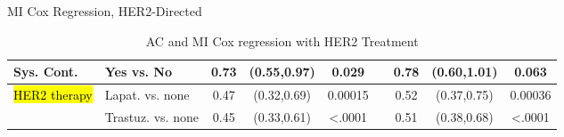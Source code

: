 \begin{frame}{MI Cox Regression, HER2-Directed}
\begin{table}[]
{\begin{tabular}{|l|l|c|c|c|c|c|c|c|}
Sys. Cont.                     & Yes vs. No                       & 0.73                  & (0.55,0.97)                                        & 0.029                 &                       & 0.78 & (0.60,1.01)                                                          & 0.063                                                       \\ \hline
\hl{HER2 therapy}                   & Lapat. vs. none                   & 0.47                  & (0.32,0.69)                                        & 0.00015               &                       & 0.52 & (0.37,0.75)                                                          & 0.00036                                                     \\ \hline
                               & Trastuz. vs. none                 & 0.45                  & (0.33,0.61)                                        & \textless.0001        &                       & 0.51 & (0.38,0.68)                                                          & \textless.0001                                              \\ \hline
\end{tabular}
}
\caption{AC and MI Cox regression with HER2 Treatment}

\end{table}
\end{frame}